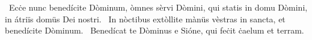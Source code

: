 ~Ecċe nunc benedícite Dòminum, òmnes sèrvi Dòmini, qui statis in domu Dòmini, in átriïs domüs Dei nostri. 
~In nòctibus extòllite mànüs vèstras in sancta, et benedícite Dòminum. 
~Benedícat te Dòminus e Sióne, qui feċit ċaelum et terram. 
